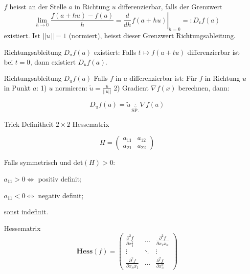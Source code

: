 $f$ heisst an der Stelle $a$ in Richtung $u$ differenzierbar, falls der Grenzwert 
	\[
		\lim_{h\to0}\frac{f(a + hu) -f(a)}{h} =
		\left.\frac{d}{dh}f(a+hu)\right|_{h = 0}
		=: D_vf(a)
	\]
existiert. Ist $||u|| = 1$ (normiert), heisst dieser Grenzwert Richtungsableitung.

\begin{Rezept}{Richtungsableitung $D_uf(a)$ existiert:}{} Falls $t \mapsto f(a + tu)$ differenzierbar ist bei $t=0$, dann existiert $D_uf(a)$.
\end{Rezept}

\begin{Rezept}{Richtungsableitung $D_u f(a)$}{}
Falls $f$ in $a$ differenzierbar ist: Für $f$ in Richtung $u$ in Punkt $a$: 1) $u$ normieren: $\tilde{u} = \frac{u}{||u||}$ 2) Gradient $\nabla f(x)$ berechnen, dann:

\[
    D_u f(a) = \tilde{u} \underbrace{\cdot}_{\text{SP.}} \nabla f(a)
\]
\end{Rezept}
	


\begin{Rezept}{Trick Definitheit $2\times 2$ Hessematrix}{}

\[
    H =
        \begin{pmatrix}
            a_{11} & a_{12}\\
            a_{21} & a_{22}
        \end{pmatrix}
\]

Falls symmetrisch und $\text{det}(H) > 0$:

$a_{11} > 0 \iff$ positiv definit;

$a_{11} < 0 \iff$ negativ definit;

sonst indefinit.
\end{Rezept}


\begin{Definition}{Hessematrix}{}
\[
    \mathbf{Hess}(f) =
        \begin{pmatrix}
            \frac{\partial^2 f}{\partial x_1^2}&\hdots&\frac{\partial^2 f}{\partial x_1 x_n}\\
            \vdots&\ddots&\vdots\\
            \frac{\partial^2 f}{\partial x_n x_1}&\hdots&\frac{\partial^2 f}{\partial x_n^2}
        \end{pmatrix}
\]
\end{Definition}

